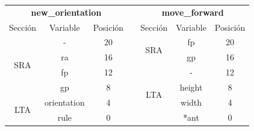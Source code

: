 \documentclass[a4paper, 10pt, twoside, notitlepage]{article}
\begin{document}
\begin{table}[htp]
\centering
\begin{tabular}{ccclccc}
\multicolumn{3}{c}{\textbf{new\_orientation}}                                                                 &                       & \multicolumn{3}{c}{\textbf{move\_forward}}                                                                \\ \cline{1-3} \cline{5-7} 
\multicolumn{1}{|l|}{Sección}              & \multicolumn{1}{c|}{Variable}    & \multicolumn{1}{c|}{Posición} & \multicolumn{1}{l|}{} & \multicolumn{1}{c|}{Sección}              & \multicolumn{1}{c|}{Variable} & \multicolumn{1}{c|}{Posición} \\ \cline{1-3} \cline{5-7} 
\multicolumn{1}{|c|}{\multirow{4}{*}{SRA}} & \multicolumn{1}{c|}{-}           & \multicolumn{1}{c|}{20}       & \multicolumn{1}{l|}{} & \multicolumn{1}{c|}{\multirow{2}{*}{SRA}} & \multicolumn{1}{c|}{fp}       & \multicolumn{1}{c|}{20}       \\ \cline{2-3} \cline{6-7} 
\multicolumn{1}{|c|}{}                     & \multicolumn{1}{c|}{ra}          & \multicolumn{1}{c|}{16}       & \multicolumn{1}{l|}{} & \multicolumn{1}{c|}{}                     & \multicolumn{1}{c|}{gp}       & \multicolumn{1}{c|}{16}       \\ \cline{2-3} \cline{5-7} 
\multicolumn{1}{|c|}{}                     & \multicolumn{1}{c|}{fp}          & \multicolumn{1}{c|}{12}       & \multicolumn{1}{l|}{} & \multicolumn{1}{c|}{\multirow{4}{*}{LTA}} & \multicolumn{1}{c|}{-}        & \multicolumn{1}{c|}{12}       \\ \cline{2-3} \cline{6-7} 
\multicolumn{1}{|c|}{}                     & \multicolumn{1}{c|}{gp}          & \multicolumn{1}{c|}{8}        & \multicolumn{1}{l|}{} & \multicolumn{1}{c|}{}                     & \multicolumn{1}{c|}{height}   & \multicolumn{1}{c|}{8}        \\ \cline{1-3} \cline{6-7} 
\multicolumn{1}{|c|}{\multirow{2}{*}{LTA}} & \multicolumn{1}{c|}{orientation} & \multicolumn{1}{c|}{4}        & \multicolumn{1}{l|}{} & \multicolumn{1}{c|}{}                     & \multicolumn{1}{c|}{width}    & \multicolumn{1}{c|}{4}        \\ \cline{2-3} \cline{6-7} 
\multicolumn{1}{|c|}{}                     & \multicolumn{1}{c|}{rule}        & \multicolumn{1}{c|}{0}        & \multicolumn{1}{l|}{} & \multicolumn{1}{c|}{}                     & \multicolumn{1}{c|}{*ant}     & \multicolumn{1}{c|}{0}        \\ \cline{1-3} \cline{5-7} 
\end{tabular}
\end{table}
\end{document}
